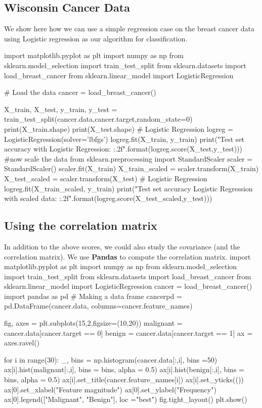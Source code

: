 \documentclass[%
oneside,                 %
final,                   %
10pt]{article}
\begin{document}
\subsection{Wisconsin Cancer Data}

We show here how we can use a simple regression case on the breast
cancer data using Logistic regression as our algorithm for
classification.


\bpycod
import matplotlib.pyplot as plt
import numpy as np
from sklearn.model_selection import  train_test_split 
from sklearn.datasets import load_breast_cancer
from sklearn.linear_model import LogisticRegression

# Load the data
cancer = load_breast_cancer()

X_train, X_test, y_train, y_test = train_test_split(cancer.data,cancer.target,random_state=0)
print(X_train.shape)
print(X_test.shape)
# Logistic Regression
logreg = LogisticRegression(solver='lbfgs')
logreg.fit(X_train, y_train)
print("Test set accuracy with Logistic Regression: {:.2f}".format(logreg.score(X_test,y_test)))
#now scale the data
from sklearn.preprocessing import StandardScaler
scaler = StandardScaler()
scaler.fit(X_train)
X_train_scaled = scaler.transform(X_train)
X_test_scaled = scaler.transform(X_test)
# Logistic Regression
logreg.fit(X_train_scaled, y_train)
print("Test set accuracy Logistic Regression with scaled data: {:.2f}".format(logreg.score(X_test_scaled,y_test)))
\epycod

\subsection{Using the correlation matrix}

In addition to the above scores, we could also study the covariance (and the correlation matrix).
We use \textbf{Pandas} to compute the correlation matrix.
\bpycod
import matplotlib.pyplot as plt
import numpy as np
from sklearn.model_selection import  train_test_split 
from sklearn.datasets import load_breast_cancer
from sklearn.linear_model import LogisticRegression
cancer = load_breast_cancer()
import pandas as pd
# Making a data frame
cancerpd = pd.DataFrame(cancer.data, columns=cancer.feature_names)

fig, axes = plt.subplots(15,2,figsize=(10,20))
malignant = cancer.data[cancer.target == 0]
benign = cancer.data[cancer.target == 1]
ax = axes.ravel()

for i in range(30):
    _, bins = np.histogram(cancer.data[:,i], bins =50)
    ax[i].hist(malignant[:,i], bins = bins, alpha = 0.5)
    ax[i].hist(benign[:,i], bins = bins, alpha = 0.5)
    ax[i].set_title(cancer.feature_names[i])
    ax[i].set_yticks(())
ax[0].set_xlabel("Feature magnitude")
ax[0].set_ylabel("Frequency")
ax[0].legend(["Malignant", "Benign"], loc ="best")
fig.tight_layout()
plt.show()
\end{document}
